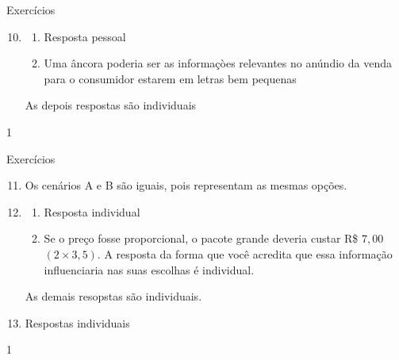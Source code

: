 \clearmargin
\begin{answer}{Exercícios}
{\exerciselist

  \begin{enumerate}\setcounter{enumi}{9}
  \item
  \begin{enumerate}
    \item Resposta pessoal
    \item Uma âncora poderia ser as informaçòes relevantes no anúndio da venda para o consumidor estarem em letras bem pequenas
  \end{enumerate}
  As depois respostas são individuais
\end{enumerate}
}{1}
\end{answer}

\clearmargin
\begin{answer}{Exercícios}
{\exerciselist

  \begin{enumerate}\setcounter{enumi}{10}
    \item Os cenários A e B são iguais, pois representam as mesmas opções.
    \item
    \begin{enumerate}
      \item Resposta individual
      \item Se o preço fosse proporcional, o pacote grande deveria custar R\$ $7{,}00$ $(2\times3{,}5)$. A resposta da forma que você acredita que essa informação influenciaria nas suas escolhas é individual.
    \end{enumerate}
    As demais resopstas são individuais.
    \item Respostas individuais
  \end{enumerate}
}{1}
\end{answer}
\clearmargin
